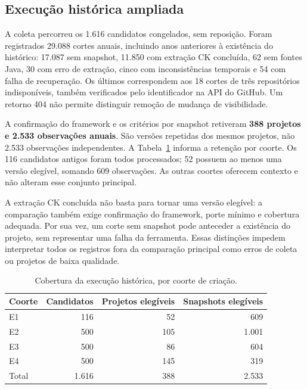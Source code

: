 \subsection{Execução histórica ampliada}
\label{subsec:ampliacao-historica}

A coleta percorreu os 1.616 candidatos congelados, sem reposição. Foram registrados 29.088 cortes anuais, incluindo anos anteriores à existência do histórico: 17.087 sem snapshot, 11.850 com extração CK concluída, 62 sem fontes Java, 30 com erro de extração, cinco com inconsistências temporais e 54 com falha de recuperação. Os últimos correspondem aos 18 cortes de três repositórios indisponíveis, também verificados pelo identificador na API do GitHub. Um retorno 404 não permite distinguir remoção de mudança de visibilidade.

A confirmação do framework e os critérios por snapshot retiveram \textbf{388 projetos e 2.533 observações anuais}. São versões repetidas dos mesmos projetos, não 2.533 observações independentes. A Tabela~\ref{tab:historico-cobertura} informa a retenção por coorte. Os 116 candidatos antigos foram todos processados; 52 possuem ao menos uma versão elegível, somando 609 observações. As outras coortes oferecem contexto e não alteram esse conjunto principal.

A extração CK concluída não basta para tornar uma versão elegível: a comparação também exige confirmação do framework, porte mínimo e cobertura adequada. Por sua vez, um corte sem snapshot pode anteceder a existência do projeto, sem representar uma falha da ferramenta. Essas distinções impedem interpretar todos os registros fora da comparação principal como erros de coleta ou projetos de baixa qualidade.

\begin{table}[htbp]
\centering\small
\caption{Cobertura da execução histórica, por coorte de criação.}
\label{tab:historico-cobertura}
\begin{tabular}{lrrr}
\hline
Coorte & Candidatos & Projetos elegíveis & Snapshots elegíveis \\
\hline
E1 & 116 & 52 & 609 \\
E2 & 500 & 105 & 1.001 \\
E3 & 500 & 86 & 604 \\
E4 & 500 & 145 & 319 \\
Total & 1.616 & 388 & 2.533 \\
\hline
\end{tabular}
\end{table}

